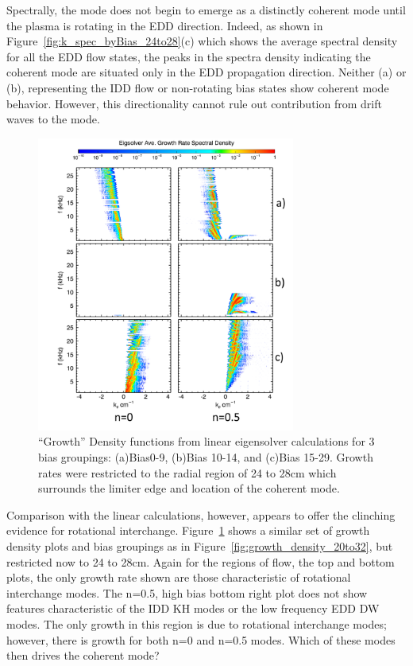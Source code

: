 \documentclass[aip,pop,amsmath,amssymb,reprint,superscriptaddress]{revtex4-1} %
\begin{document}
Spectrally, the mode does not begin to emerge as a distinctly coherent mode until the plasma is rotating in the EDD direction. Indeed, as shown in Figure~\ref{fig:k_spec_byBias_24to28}(c) which shows the average spectral density for all the EDD flow states, the peaks in the spectra density indicating the coherent mode are situated only in the EDD propagation direction. Neither (a) or (b), representing the IDD flow or non-rotating bias states show coherent mode behavior. However, this directionality cannot rule out contribution from drift waves to the mode.

\begin{figure}[!htbp]
\centerline{
\includegraphics[width=8.5cm]{growth_density_24to28_lab}}%
\caption{\label{fig:growth_density_24to28} ``Growth'' Density functions from linear eigensolver calculations for 3 bias groupings: (a)Bias0-9, (b)Bias 10-14, and (c)Bias 15-29. Growth rates were restricted to the radial region of 24 to 28cm which surrounds the limiter edge and location of the coherent mode.}
\end{figure}

Comparison with the linear calculations, however, appears to offer the clinching evidence for rotational interchange. Figure~\ref{fig:growth_density_24to28} shows a similar set of growth density plots and bias groupings as in Figure~\ref{fig:growth_density_20to32}, but restricted now to 24 to 28cm. Again for the regions of flow, the top and bottom plots, the only growth rate shown are those characteristic of rotational interchange modes. The n=0.5, high bias bottom right plot does not show features characteristic of the IDD KH modes or the low frequency EDD DW modes. The only growth in this region is due to rotational interchange modes; however, there is growth for both n=0 and n=0.5 modes. Which of these modes then drives the coherent mode?
\end{document}

